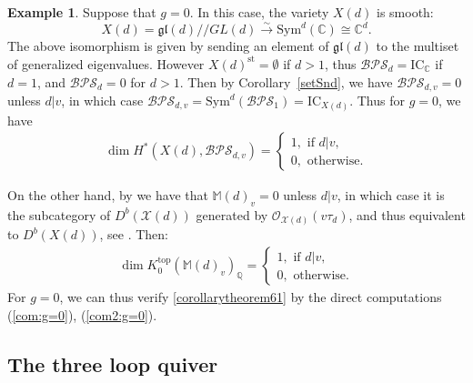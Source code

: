 \documentclass [11pt,oneside,a4paper,mathscr]{amsart}
\theoremstyle{definition}
\newtheorem{example}[thm]{Example}
\newcommand{\X}{\mathscr{X}}
\newcommand{\ssslash}{/\!\!/}
\begin{document}
\begin{example}
Suppose that $g=0$. In this case, the 
variety $X(d)$ is smooth:
\[X(d)=\mathfrak{gl}(d)\ssslash GL(d) \stackrel{\sim}{\to} \mathrm{Sym}^d(\mathbb{C}) \cong\mathbb{C}^d.\] 
The above isomorphism is given by sending an element of $\mathfrak{gl}(d)$ to the
multiset of generalized eigenvalues. 
However $X(d)^{\mathrm{st}}=\emptyset$ if $d>1$, 
thus $\mathcal{BPS}_d=\mathrm{IC}_{\mathbb{C}}$ if 
$d=1$, and $\mathcal{BPS}_d=0$ for $d>1$.  
Then by Corollary~\ref{setSnd}, we have 
$\mathcal{BPS}_{d,v}=0$ unless $d|v$, in which case $\mathcal{BPS}_{d,v}=\mathrm{Sym}^d(\mathcal{BPS}_1)=\mathrm{IC}_{X(d)}$.
Thus for $g=0$, we have 
\begin{align}\label{com:g=0}
\dim H^{\ast}(X(d), \mathcal{BPS}_{d,v})=\begin{cases}
    1,\text{ if }d|v,\\ 0, \text{ otherwise.}
\end{cases}
\end{align}

On the other hand, by \cite[Lemma 3.2]{Toquot2} we have that $\mathbb{M}(d)_v=0$ unless $d|v$, in which case it is the subcategory of $D^b(\X(d))$ generated by $\mathcal{O}_{\X(d)}(v\tau_d)$, and thus equivalent to $D^b(X(d))$, see \cite[Lemma 3.3]{Toquot2}. Then:
\begin{align}\label{com2:g=0}\dim K^{\mathrm{top}}_0(\mathbb{M}(d)_v)_{\mathbb{Q}}=\begin{cases}
    1,\text{ if }d|v,\\ 0, \text{ otherwise.}
\end{cases}
\end{align}
For $g=0$, we can thus verify \eqref{corollarytheorem61} by the direct computations (\ref{com:g=0}), (\ref{com2:g=0}). 
\end{example}


\subsection{The three loop quiver}
\end{document}
